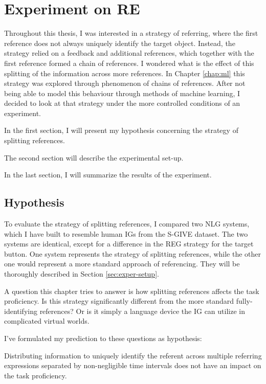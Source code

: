 \chapter{Experiment on RE}
Throughout this thesis, I was interested in a strategy of referring, where the first reference does not always uniquely identify the target object. Instead, the strategy relied on a feedback and additional references, which together with the first reference formed a chain of references. I wondered what is the effect of this splitting of the information across more references. In Chapter \ref{chap:ml} this strategy was explored through phenomenon of chains of references. After not being able to model this behaviour through methods of machine learning, I decided to look at that strategy under the more controlled conditions of an experiment.

In the first section, I will present my hypothesis concerning the strategy of splitting references. 

The second section will describe the experimental set-up. 

In the last section, I will summarize the results of the experiment.

\section{Hypothesis}
To evaluate the strategy of splitting references, I compared two NLG systems, which I have built to resemble human IGs from the S-GIVE dataset. The two systems are identical, except for a difference in the REG strategy for the target button. One system represents the strategy of splitting references, while the other one would represent a more standard approach of referencing. They will be thoroughly described in Section \ref{sec:exper-setup}.

A question this chapter tries to answer is how splitting references affects the task proficiency. Is this strategy significantly different from the more standard fully-identifying references? Or is it simply a language device the IG can utilize in complicated virtual worlds.

I've formulated my prediction to these questions as hypothesis:

\begin{hypo}
Distributing information to uniquely identify the referent across multiple referring expressions separated by non-negligible time intervals does not have an impact on the task proficiency.
\end{hypo}

